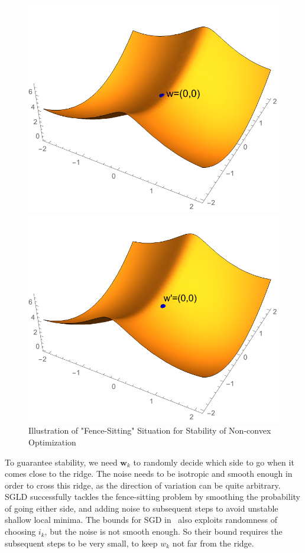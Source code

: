 \documentclass[final,12pt]{colt2018} %
\begin{document}
\begin{figure}[htb]
\begin{minipage}[t]{0.5\linewidth}
\centering
\includegraphics[width=0.8\linewidth]{Untitled-1.pdf}
\end{minipage}
\begin{minipage}[t]{0.5\linewidth}
\centering
\includegraphics[width=0.8\linewidth]{Untitled-2.pdf}
\end{minipage}
\caption{Illustration of "Fence-Sitting" Situation for Stability of Non-convex Optimization}\label{illustration}
\end{figure}

To guarantee stability, we need $\bm{w}_k$ to randomly decide which side to go when it comes close to the ridge. The noise needs to be isotropic and smooth enough in order to cross this ridge, as the direction of variation can be quite arbitrary. SGLD successfully tackles the fence-sitting problem by smoothing the probability of going either side, and adding noise to subsequent steps to avoid unstable shallow local minima. The bounds for SGD in~\citet{hardt2015train} also exploits randomness of choosing $i_k$, but the noise is not smooth enough. So their bound requires the subsequent steps to be very small, to keep $w_k$ not far from the ridge.\\
\end{document}
